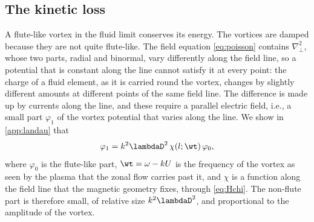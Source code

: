 \subsection{The kinetic loss}\label{sec:loss}

A flute-like vortex in the fluid limit conserves its energy. The vortices are damped because they are not quite flute-like. The field equation \cref{eq:poisson} contains \(\nabla_\perp^2\), whose two parts, radial and binormal, vary differently along the field line, so a potential that is constant along the line cannot satisfy it at every point: the charge of a fluid element, as it is carried round the vortex, changes by slightly different amounts at different points of the same field line. The difference is made up by currents along the line, and these require a parallel electric field, i.e., a small part \(\varphi_1\) of the vortex potential that varies along the line. We show in \cref{app:landau} that
\begin{equation}
\varphi_1 = k^2\lambdaD^2\,\chi(l;\wt)\,\varphi_0,
\label{eq:nonflute}
\end{equation}
where \(\varphi_0\) is the flute-like part, \(\wt = \omega - kU\) is the frequency of the vortex as seen by the plasma that the zonal flow carries past it, and \(\chi\) is a function along the field line that the magnetic geometry fixes, through \cref{eq:Hchi}. The non-flute part is therefore small, of relative size \(k^2\lambdaD^2\), and proportional to the amplitude of the vortex.

